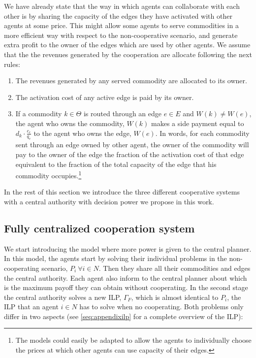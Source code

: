 \documentclass[authoryear]{elsarticle}
\begin{document}
We have already state that the way in which agents can collaborate with each other is by sharing the capacity of the edges they have activated with other agents at some price. This might allow some agents to serve commodities in a more efficient way with respect to the non-cooperative scenario, and generate extra profit to the owner of the edges which are used by other agents.
We assume that the the revenues generated by the cooperation are allocate following the next rules:
\begin{enumerate}
    \item The revenues generated by any served commodity are
    allocated to its owner.
    \item The activation cost of any active edge is paid by its owner.
    \item If a commodity $k\in \Theta$ is routed through an edge $e		\in E$ and $W(k)\not = W(e)$, the agent who owns the commodity, $W(k)$ makes a side payment equal to $d_k \cdot\frac{c_e}{q_e}$ to the agent who owns the edge, $W(e)$. In words, for each commodity sent through an edge owned by other agent, the owner of the commodity will pay to the owner of the edge the fraction of the activation cost of that edge equivalent 	to the fraction of the total capacity of the edge that his 	commodity occupies.\footnote{The models could easily be adapted to allow the agents to individually choose the prices at which other agents can use capacity of their edges.}
\end{enumerate}

In the rest of this section we introduce the three different
cooperative systems with a central authority with decision power we propose in this work.


\subsection{Fully centralized cooperation system}

We start introducing the model where more power is given to the central planner.
In this model, the agents start by solving their individual problems in the non-cooperating scenario, $P_i\  \forall i \in N$. Then they share all their commodities and edges the central authority. Each agent also inform to the central planner about which is the maximum payoff they can obtain without cooperating. In the second stage the central authority solves a new ILP, $\Gamma_F$, which is almost identical to $P_ i$, the ILP that an agent $i\in N$ has to solve when no cooperating. Both problems only differ in
two aspects (see \ref{seq:appendixilp} for a complete overview of the ILP):
\end{document}

